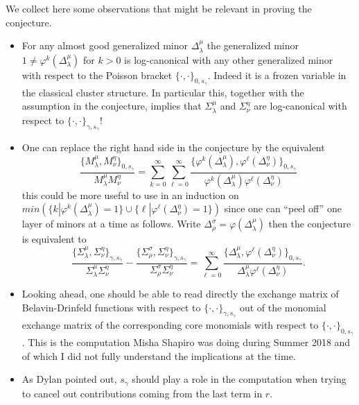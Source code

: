 \documentclass[a4paper]{amsart}
\theoremstyle{definition}
\begin{document}
We collect here some observations that might be relevant in proving the conjecture.
\begin{itemize}
  \item
   For any almost good generalized minor $\Delta_\lambda^\mu$ the generalized minor $1\neq\varphi^k(\Delta_\lambda^\mu)$ for $k>0$ is log-canonical with any other generalized minor with respect to the Poisson bracket $\{\cdot,\cdot\}_{0,s_\gamma}$.
   Indeed it is a frozen variable in the classical cluster structure.
   In particular this, together with the assumption in the conjecture, implies that $\Sigma_\lambda^\mu$ and $\Sigma_\nu^\eta$ are log-canonical with respect to $\{\cdot,\cdot\}_{\gamma,s_\gamma}$!

 \item
   One can replace the right hand side in the conjecture by the equivalent
   \[
     \frac{\{M_\lambda^\mu,M_\nu^\eta\}_{0,s_\gamma}}{M_\lambda^\mu M_\nu^\eta}
     =
     \sum_{k=0}^\infty\sum_{\ell=0}^\infty \frac{\{\varphi^k(\Delta_\lambda^\mu),\varphi^\ell(\Delta_\nu^\eta)\}_{0,s_\gamma}}{\varphi^k(\Delta_\lambda^\mu)\varphi^\ell(\Delta_\nu^\eta)}
   \]
   this could be more useful to use in an induction on $min(\{k | \varphi^k(\Delta_\lambda^\mu)=1\}\cup \{\ell | \varphi^\ell(\Delta_\nu^\eta)=1\} )$ since one can ``peel off'' one layer of minors at a time as follows.
   Write $\Delta_\rho^\sigma = \varphi(\Delta_\lambda^\mu)$ then the conjecture is equivalent to
   \[
     \frac{\{\Sigma_\lambda^\mu,\Sigma_\nu^\eta\}_{\gamma,s_\gamma}}{\Sigma_\lambda^\mu \Sigma_\nu^\eta}
     -
     \frac{\{\Sigma_\rho^\sigma,\Sigma_\nu^\eta\}_{\gamma,s_\gamma}}{\Sigma_\rho^\sigma \Sigma_\nu^\eta}
     =
     \sum_{\ell=0}^\infty \frac{\{\Delta_\lambda^\mu,\varphi^\ell(\Delta_\nu^\eta)\}_{0,s_\gamma}}{\Delta_\lambda^\mu\varphi^\ell(\Delta_\nu^\eta)}
     .
   \]

 \item
   Looking ahead, one should be able to read directly the exchange matrix of Belavin-Drinfeld functions with respect to $\{\cdot,\cdot\}_{\gamma,s_\gamma}$ out of the monomial exchange matrix of the corresponding core monomials with respect to $\{\cdot,\cdot\}_{0,s_\gamma}$.
   This is the computation Misha Shapiro was doing during Summer 2018 and of which I did not fully understand the implications at the time.

 \item 
   As Dylan pointed out, $s_\gamma$ should play a role in the computation when trying to cancel out contributions coming from the last term in $r$.
\end{itemize}
\end{document}
